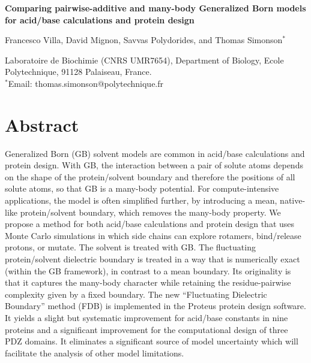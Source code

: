 \documentclass[a4paper,12pt]{article}
\begin{document}
 

\parindent 0mm

\begin{center}

\Large 
{\bf Comparing pairwise-additive and many-body Generalized Born models for acid/base calculations and protein design}

\large

\vspace{.5 cm}

Francesco Villa, David Mignon, Savvas Polydorides, and Thomas Simonson$^{\ast}$

\vspace{.5 cm}

\normalsize
 
Laboratoire de Biochimie (CNRS UMR7654), Department of Biology, 
Ecole Polytechnique, 91128 Palaiseau, France. \\
$^{\ast}$Email: thomas.simonson@polytechnique.fr

\end{center}

\vspace{0.5cm}

\section*{Abstract}
Generalized Born (GB) solvent models are common in acid/base calculations and protein design. With GB, the
interaction between a pair of solute atoms depends on the shape of the protein/solvent boundary and therefore
the positions of all solute atoms, so that GB is a many-body potential. For compute-intensive applications,
the model is often simplified further, by introducing a mean, native-like protein/solvent boundary, which
removes the many-body property. We propose a method for both acid/base calculations and protein design that
uses Monte Carlo simulations in which side chains can explore rotamers, bind/release protons, or mutate. The
solvent is treated with GB. The fluctuating protein/solvent dielectric boundary is treated in a way that is
numerically exact (within the GB framework), in contrast to a mean boundary. Its originality is that it captures
the many-body character while retaining the residue-pairwise complexity given by a fixed boundary. The new
``Fluctuating Dielectric Boundary'' method (FDB) is implemented in the Proteus protein design software.
It yields a slight but systematic improvement for acid/base constants in nine proteins and a significant
improvement for the computational design of three PDZ domains. It eliminates a significant source
of model uncertainty which will facilitate the analysis of other model limitations. 
\end{document}
